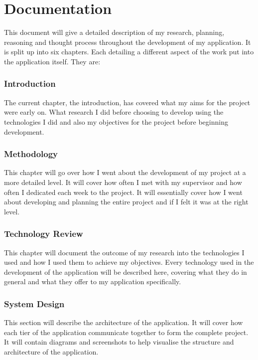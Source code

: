 \section{Documentation}
This document will give a detailed description of my research, planning, reasoning and thought process throughout the development of my application. It is split up into six chapters. Each detailing a different aspect of the work put into the application itself. They are: 

    \subsubsection{Introduction}
    The current chapter, the introduction, has covered what my aims for the project were early on. What research I did before choosing to develop using the technologies I did and also my objectives for the project before beginning development.
    
    \subsubsection{Methodology}
    This chapter will go over how I went about the development of my project at a more detailed level. It will cover how often I met with my supervisor and how often I dedicated each week to the project. It will essentially cover how I went about developing and planning the entire project and if I felt it was at the right level. 
    
    \subsubsection{Technology Review}
    This chapter will document the outcome of my research into the technologies I used and how I used them to achieve my objectives. Every technology used in the development of the application will be described here, covering what they do in general and what they offer to my application specifically.
    
    \subsubsection{System Design}
    This section will describe the architecture of the application. It will cover how each tier of the application communicate together to form the complete project. It will contain diagrams and screenshots to help visualise the structure and architecture of the application.
    
